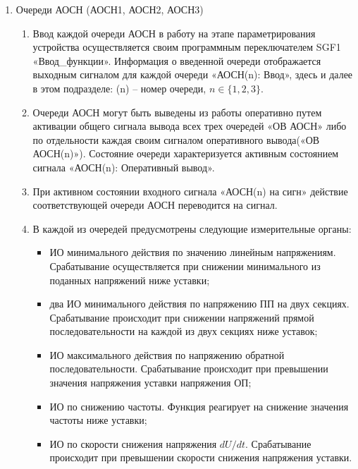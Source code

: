 \begin{enumerate}
\begin{enumerate}
\item
Функциональный блок «АОСН» может быть полностью выведен из работы оперативно путем активации сигнала «ОВ АОСН/АПВН».

\item
В таблице \ref{aosn:tbl1} приведены параметры, необходимые для настройки АОСН.


\end{enumerate}


\item Очереди АОСН (АОСН1, АОСН2, АОСН3)\label{punktaosn}

\begin{enumerate}

\item
Ввод каждой очереди АОСН в работу на этапе параметрирования устройства осуществляется своим программным переключателем SGF1 «Ввод\_функции». Информация о введенной очереди отображается выходным сигналом для каждой очереди «АОСН(n): Ввод», здесь и далее в этом подразделе: (n) -- номер очереди, $n\in\{1,2,3\}$.

\item
Очереди АОСН могут быть выведены из работы оперативно путем активации общего сигнала вывода всех трех очередей «ОВ АОСН» либо по отдельности каждая своим сигналом оперативного вывода(«ОВ АОСН(n)»). Состояние очереди характеризуется активным состоянием сигнала «АОСН(n): Оперативный вывод».

\item
При активном состоянии входного сигнала «АОСН(n) на сигн»  действие соответствующей очереди АОСН переводится на сигнал.

\item
В каждой из очередей предусмотрены следующие измерительные органы:
\begin{itemize}
    \item ИО минимального действия по значению линейным напряжениям. Срабатывание осуществляется при снижении минимального из поданных напряжений ниже уставки;
    \item два ИО минимального действия по напряжению ПП на двух секциях. Срабатывание происходит при снижении напряжений прямой последовательности на каждой из двух секциях ниже уставок;
    \item ИО максимального действия по напряжению обратной последовательности. Срабатывание происходит при превышении значения напряжения уставки напряжения ОП;
    \item ИО по снижению частоты. Функция реагирует на снижение значения частоты ниже уставки;
    \item ИО по скорости снижения напряжения $dU/dt$. Срабатывание происходит при превышении скорости снижения напряжения уставки.
\end{itemize}


\end{enumerate}
\end{enumerate}
